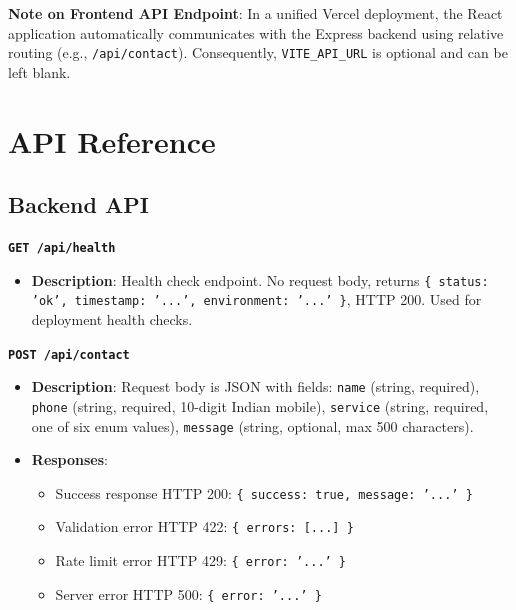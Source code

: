 \documentclass[11pt,a4paper]{article}
\begin{document}
\noindent \textbf{Note on Frontend API Endpoint}: In a unified Vercel deployment, the React application automatically communicates with the Express backend using relative routing (e.g., \texttt{/api/contact}). Consequently, \texttt{VITE\_API_URL} is optional and can be left blank.

\section{API Reference}
\subsection*{Backend API}

\textbf{\texttt{GET /api/health}}
\begin{itemize}
    \item \textbf{Description}: Health check endpoint. No request body, returns \texttt{\{ status: 'ok', timestamp: '...', environment: '...' \}}, HTTP 200. Used for deployment health checks.
\end{itemize}

\textbf{\texttt{POST /api/contact}}
\begin{itemize}
    \item \textbf{Description}: Request body is JSON with fields: \texttt{name} (string, required), \texttt{phone} (string, required, 10-digit Indian mobile), \texttt{service} (string, required, one of six enum values), \texttt{message} (string, optional, max 500 characters).
    \item \textbf{Responses}:
        \begin{itemize}
            \item Success response HTTP 200: \texttt{\{ success: true, message: '...' \}}
            \item Validation error HTTP 422: \texttt{\{ errors: [...] \}}
            \item Rate limit error HTTP 429: \texttt{\{ error: '...' \}}
            \item Server error HTTP 500: \texttt{\{ error: '...' \}}
        \end{itemize}
\end{itemize}
\end{document}
